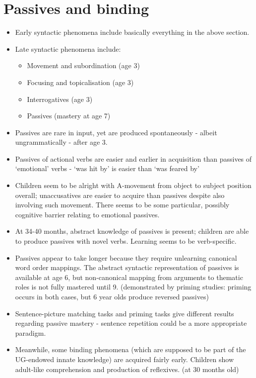 \documentclass{article}
\begin{document}
\section{Passives and binding}
\begin{itemize}
    \item Early syntactic phenomena include basically everything in the above section.
    \item Late syntactic phenomena include:
    \begin{itemize}
        \item Movement and subordination (age 3)
        \item Focusing and topicalisation (age 3)
        \item Interrogatives (age 3)
        \item Passives (mastery at age 7)
    \end{itemize}
    \item Passives are rare in input, yet are produced spontaneously - albeit ungrammatically - after age 3.
    \item Passives of actional verbs are easier and earlier in acquisition than passives of `emotional' verbs - `was hit by' is easier than `was feared by'
    \item Children seem to be alright with A-movement from object to subject position overall; unaccusatives are easier to acquire than passives despite also involving such movement. There seems to be some particular, possibly cognitive barrier relating to emotional passives.
    \item At 34-40 months, abstract knowledge of passives is present; children are able to produce passives with novel verbs. Learning seems to be verb-specific.
    \item Passives appear to take longer because they require unlearning canonical word order mappings. The abstract syntactic representation of passives is available at age 6, but non-canonical mapping from arguments to thematic roles is not fully mastered until 9. (demonstrated by priming studies: priming occurs in both cases, but 6 year olds produce reversed passives)
    \item Sentence-picture matching tasks and priming tasks give different results regarding passive mastery - sentence repetition could be a more appropriate paradigm.
    \item Meanwhile, some binding phenomena (which are supposed to be part of the UG-endowed innate knowledge) are acquired fairly early. Children show adult-like comprehension and production of reflexives. (at 30 months old)

\end{itemize}
\end{document}

